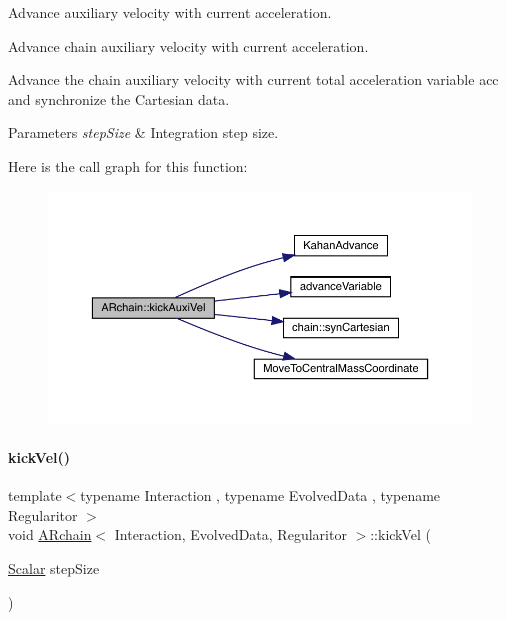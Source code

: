 Advance auxiliary velocity with current acceleration. 

Advance chain auxiliary velocity with current acceleration.

Advance the chain auxiliary velocity with current total acceleration variable \textquotesingle{}acc\textquotesingle{} and synchronize the Cartesian data. 
\begin{DoxyParams}{Parameters}
{\em step\+Size} & Integration step size. \\
\hline
\end{DoxyParams}
Here is the call graph for this function\+:\nopagebreak
\begin{figure}[H]
\begin{center}
\leavevmode
\includegraphics[width=350pt]{class_a_rchain_a53838a7890cee54c69786bda87dd6cd9_cgraph}
\end{center}
\end{figure}
\mbox{\label{class_a_rchain_a0b073cd82321047d7fafda59cef998ef}} 
\paragraph{\texorpdfstring{kick\+Vel()}{kickVel()}}
{\footnotesize\ttfamily template$<$typename Interaction , typename Evolved\+Data , typename Regularitor $>$ \\
void \mbox{\hyperlink{class_a_rchain}{A\+Rchain}}$<$ Interaction, Evolved\+Data, Regularitor $>$\+::kick\+Vel (\begin{DoxyParamCaption}\item[{\mbox{\hyperlink{class_a_rchain_a707e42a79e4744424a34c9007e84ee07}{Scalar}}}]{step\+Size }\end{DoxyParamCaption})\hspace{0.3cm}{\ttfamily [private]}}



